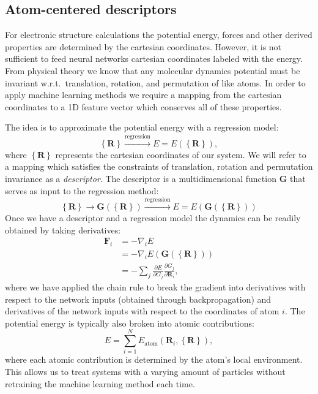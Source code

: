 \subsection{Atom-centered descriptors}
For electronic structure calculations the potential energy,
forces and other derived properties are determined by
the cartesian coordinates. However, it is not sufficient
to feed neural networks cartesian coordinates labeled with
the energy. From physical theory we know that any molecular dynamics potential
must be invariant w.r.t.\ translation, rotation, and permutation
of like atoms.
In order to apply machine learning methods we require a mapping from
the cartesian coordinates to a 1D feature vector which conserves
all of these properties.
\par
The idea is to approximate the potential energy with a regression model:
\begin{equation}
\left\{\bm{R}\right\} \overset{\text{regression}}{\longrightarrow}
    E = E\left( \left\{\bm{R}\right\} \right) ,
\end{equation}
where $\left\{\bm{R}\right\}$ represents the cartesian coordinates of our system.
We will refer to a mapping which satisfies the constraints of 
translation, rotation and permutation invariance as a \textit{descriptor}. 
The descriptor is a multidimensional function $\bm{G}$ that serves as input to
the regression method:
\begin{equation}
    \left\{\bm{R}\right\} \rightarrow \bm{G} \left(\left\{\bm{R}\right\} \right)
\overset{\text{regression}}{\longrightarrow}
E = E \left(\bm{G}\left(\left\{\bm{R}\right\}\right)\right)
\end{equation}
Once we have a descriptor and a regression model the dynamics
can be readily obtained by taking derivatives:
\begin{equation}
\begin{split}
    \bm{F}_i &= -\nabla_i E \\
    &= -\nabla_i
    E(\bm{G}(\left\{\bm{R}\right\})) \\
    &= -\sum_j \frac{\partial E}
    {\partial G_j} \frac{\partial G_j}{\partial \bm{R}_i} ,
\end{split}
\end{equation}
where we have applied the chain rule to break the gradient
into derivatives with respect to the network inputs (obtained through
backpropagation) and derivatives of the network inputs with
respect to the coordinates of atom $i$.
The potential energy is typically also broken into
atomic contributions:
\begin{equation}
E = \sum_{i=1}^N E_{\text{atom}}\left(\bm{R}_i, \left\{\bm{R}\right\} \right) ,
\end{equation}
where each atomic contribution is determined by the atom's
local environment. This allows us to treat systems with
a varying amount of particles without retraining
the machine learning method each time.

